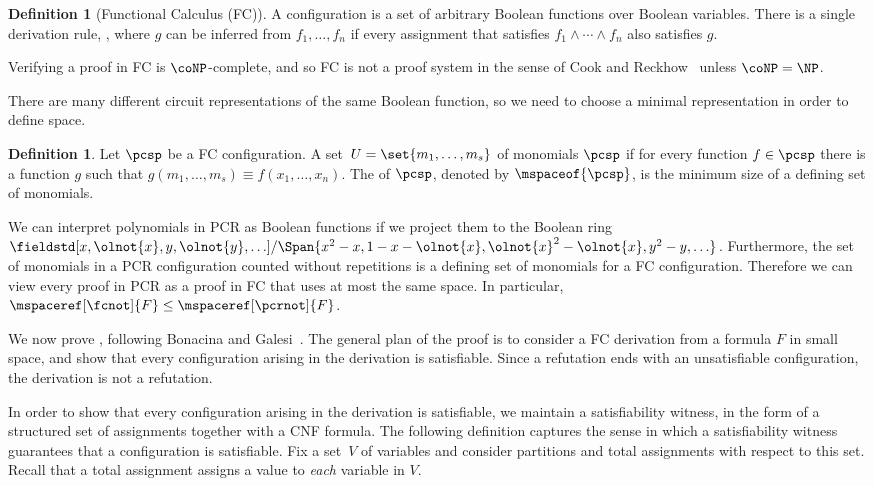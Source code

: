 \documentclass[11pt]{article}
\numberwithin{equation}{section}
\theoremstyle{definition}
\newtheorem{definition}[theorem]{Definition}
\theoremstyle{plain}
\begin{document}
\begin{definition}[Functional Calculus (FC)]
  \label{def:fc}
A  configuration is a set of arbitrary Boolean functions over Boolean variables. There is a single derivation rule, , where $g$ can be inferred from $f_1,\ldots,f_n$ if every assignment that satisfies $f_1\land\cdots\land f_n$ also satisfies $g$.
\end{definition}

Verifying a proof in FC is $\coNP$-complete, and so FC is not a proof system in the sense of Cook and Reckhow~\cite{CR79Relative} unless $\coNP = \NP$.

There are many different circuit representations of the same Boolean function, so we need to choose a minimal representation in order to define space.

\begin{definition}
  \label{def:fcspace}
  Let $\pcsp$ be a FC configuration. A %
  set~$U=\set{m_1,\ldots,m_s}$ of monomials
   $\pcsp$ if for every function $f\in\pcsp$ there is a function $g$ such that $g(m_1,\ldots,m_s)\equiv f(x_1,\ldots,x_n)$. The  of $\pcsp$, denoted by $\mspaceof{\pcsp}$, is the minimum size of a %
  defining set of monomials.
\end{definition}

We can interpret polynomials in PCR as Boolean functions if we project them to the Boolean ring $\fieldstd[x,\olnot{x}, y, \olnot{y}, \ldots]/\Span{x^2-x,1-x-\olnot{x},\olnot{x}^2-\olnot{x},y^2-y,\ldots}$. Furthermore, the set of monomials in a PCR configuration counted without repetitions is a %
defining set of monomials
for a FC configuration. Therefore we can view every proof in PCR as a proof in FC that uses at most the same space. In particular, $\mspaceref[\fcnot]{F}\leq \mspaceref[\pcrnot]{F}$.

We now prove , following Bonacina and Galesi~\cite{BG15Framework}. The general plan of the proof is to consider a FC derivation from a formula $F$ in small space, and show that every configuration arising in the derivation is satisfiable. Since a refutation ends with an unsatisfiable configuration, the derivation is not a refutation.

In order to show that every configuration arising in the derivation is satisfiable, we maintain a satisfiability witness, in the form of a structured set of assignments together with a CNF formula.  The following definition captures the sense in which a satisfiability witness guarantees that a configuration is satisfiable. Fix a %
set~$V$ of variables
and consider partitions and total assignments with respect to this set.
Recall that a total assignment assigns a value to \emph{each} variable in $V$.
\end{document}
